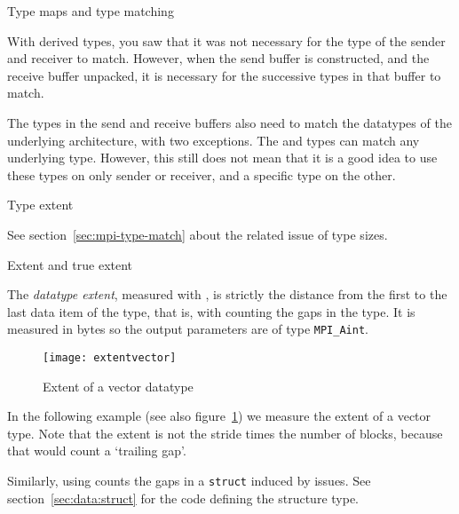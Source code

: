 
 {Type maps and type matching}

With derived types, you saw that it was not necessary for
the type of the sender and receiver to match.
However, when the send buffer is constructed,
and the receive buffer unpacked,
it is necessary for the successive types in that buffer to match.

The types in the send and receive buffers also need to match
the datatypes of the underlying architecture, with two exceptions.
The  and  types
can match any underlying type.
However, this still does not mean that it is a good idea to use
these types on only sender or receiver, and a specific type on the other.

 {Type extent}
\label{sec:mpi-type-size}

See section~\ref{sec:mpi-type-match}
about the related issue of type sizes.

 {Extent and true extent}

The \emph{datatype extent},
measured with
,
is strictly the distance from the
first to the last data item of the type,
that is, with counting the gaps in the type.
It is measured in bytes so the output parameters are
of type \lstinline+MPI_Aint+.

\begin{figure}[ht]
  \texttt{[image: extentvector]}
  \caption{Extent of a vector datatype}
  \label{fig:extentvector}
\end{figure}

In the following example
(see also figure~\ref{fig:extentvector})
we measure the extent of a vector type.
Note that the extent is not the stride times the number of blocks,
because that would count a `trailing gap'.
%

Similarly, using  counts the gaps
in a \lstinline{struct} induced by  issues.
%
%
See section~\ref{sec:data:struct} for the code defining the structure type.

